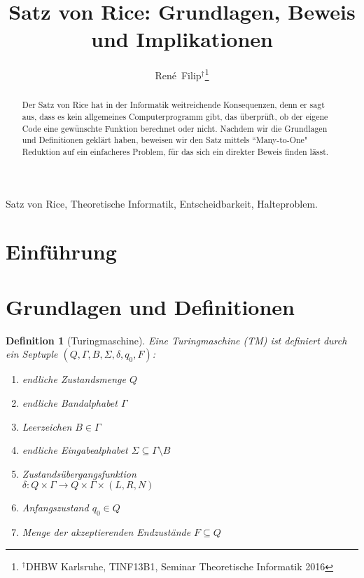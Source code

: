 \documentclass[journal]{IEEEtran}
\begin{document}
\newtheorem{definition}{Definition}
\newtheorem{theorem}[definition]{Satz}
\newtheorem{corollar}[definition]{Korollar}

\renewcommand{\proofname}{Beweis}

\title{Satz von Rice: Grundlagen, Beweis und Implikationen}


\author{René~Filip$^{\dag}$\thanks{$^{\dag}$DHBW Karlsruhe, TINF13B1, Seminar Theoretische Informatik 2016}}


\maketitle


\begin{abstract}
Der Satz von Rice hat in der Informatik weitreichende Konsequenzen, denn er sagt aus, dass es kein allgemeines Computerprogramm gibt, das überprüft, ob der eigene Code eine gewünschte Funktion berechnet oder nicht. Nachdem wir die Grundlagen und Definitionen geklärt haben, beweisen wir den Satz mittels ``Many-to-One" Reduktion auf ein einfacheres Problem, für das sich ein direkter Beweis finden lässt.
\end{abstract}


\begin{IEEEkeywords}
  Satz von Rice, Theoretische Informatik, Entscheidbarkeit, Halteproblem.
\end{IEEEkeywords}



\section{Einführung}


\section{Grundlagen und Definitionen}

  \begin{definition}[Turingmaschine]
    Eine Turingmaschine (TM) ist definiert durch ein Septuple $(Q, \Gamma, B, \Sigma, \delta, q_0, F)$:
    \begin{enumerate}
      \item endliche Zustandsmenge $Q$
      \item endliche Bandalphabet $\Gamma$
      \item Leerzeichen $B \in \Gamma$
      \item endliche Eingabealphabet $\Sigma \subseteq \Gamma \setminus B$
      \item Zustandsübergangsfunktion \\$\delta \colon Q \times \Gamma \to Q \times \Gamma \times (L, R, N)$
      \item Anfangszustand $q_0 \in Q$
      \item Menge der akzeptierenden Endzustände $F \subseteq Q$
    \end{enumerate}
  \end{definition}
\end{document}
